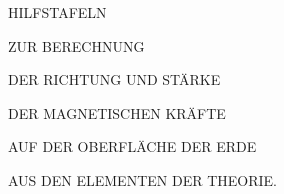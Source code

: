 \clearpage
\thispagestyle{empty}
\begin{center}
\vspace*{1in}
{\Large HILFSTAFELN\par}
\bigskip
ZUR BERECHNUNG\par
\bigskip
{\large DER RICHTUNG UND STÄRKE\par}
\bigskip
DER MAGNETISCHEN KRÄFTE\par
\bigskip
AUF DER OBERFLÄCHE DER ERDE\par
\bigskip
AUS DEN ELEMENTEN DER THEORIE.\par
\end{center}
\clearpage
{}
\begingroup
\fontsize{9}{10.2}\selectfont
\setlength{\tabcolsep}{1.5pt}
\renewcommand{\arraystretch}{1.02}
